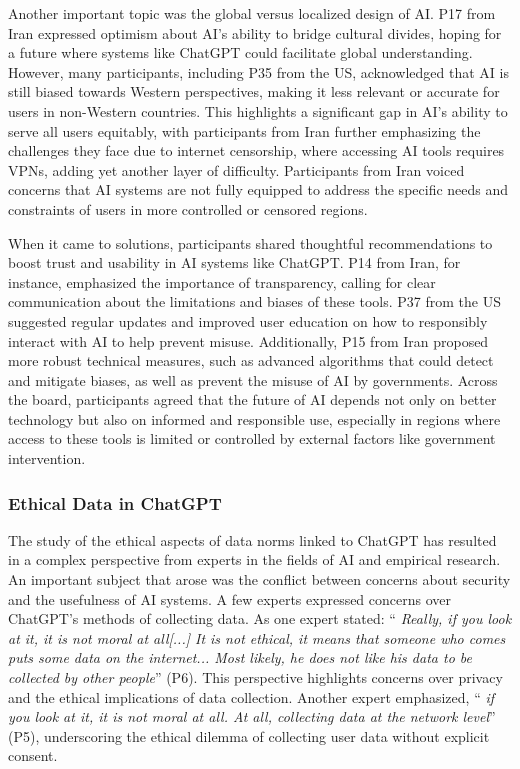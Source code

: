 \documentclass[sigconf]{acmart}
\begin{document}
Another important topic was the global versus localized design of AI. P17 from Iran expressed optimism about AI’s ability to bridge cultural divides, hoping for a future where systems like ChatGPT could facilitate global understanding. However, many participants, including P35 from the US, acknowledged that AI is still biased towards Western perspectives, making it less relevant or accurate for users in non-Western countries. This highlights a significant gap in AI’s ability to serve all users equitably, with participants from Iran further emphasizing the challenges they face due to internet censorship, where accessing AI tools requires VPNs, adding yet another layer of difficulty. Participants from Iran voiced concerns that AI systems are not fully equipped to address the specific needs and constraints of users in more controlled or censored regions.

When it came to solutions, participants shared thoughtful recommendations to boost trust and usability in AI systems like ChatGPT. P14 from Iran, for instance, emphasized the importance of transparency, calling for clear communication about the limitations and biases of these tools. P37 from the US suggested regular updates and improved user education on how to responsibly interact with AI to help prevent misuse. Additionally, P15 from Iran proposed more robust technical measures, such as advanced algorithms that could detect and mitigate biases, as well as prevent the misuse of AI by governments. Across the board, participants agreed that the future of AI depends not only on better technology but also on informed and responsible use, especially in regions where access to these tools is limited or controlled by external factors like government intervention.

\subsubsection{ Ethical Data in ChatGPT}
\hfill \break

The study of the ethical aspects of data norms linked to ChatGPT has resulted in a complex perspective from experts in the fields of AI and empirical research. An important subject that arose was the conflict between concerns about security and the usefulness of AI systems. A few experts expressed concerns over ChatGPT's methods of collecting data. As one expert stated: \enquote { \emph {Really, if you look at it, it is not moral at all[...] It is not ethical, it means that someone who comes puts some data on the internet... Most likely, he does not like his data to be collected by other people}} (P6). This perspective highlights concerns over privacy and the ethical implications of data collection. Another expert emphasized, \enquote { \emph {if you look at it, it is not moral at all. At all, collecting data at the network level}} (P5), underscoring the ethical dilemma of collecting user data without explicit consent.
\end{document}
